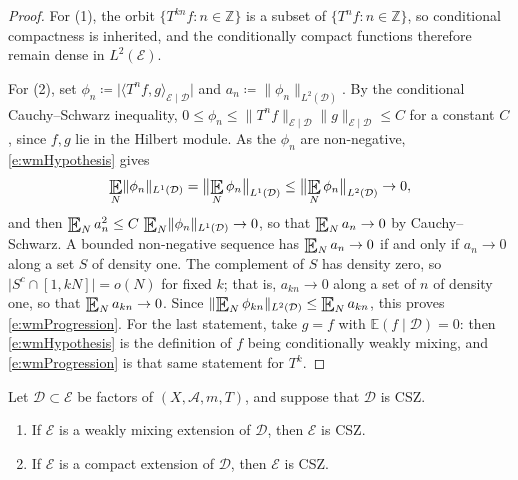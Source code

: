 \begin{proof}
For (1), the orbit $\{T ^{kn}f \colon n \in \mathbb Z\}$ is a subset of $\{T^nf \colon n \in \mathbb Z\}$, so conditional compactness is inherited, 
and the conditionally compact functions therefore remain dense in $L^2(\mathcal E)$. 

For (2), set $\phi_n \coloneqq \lvert \langle T^nf,g\rangle _{\mathcal E\mid \mathcal D}\rvert$ and $a_n \coloneqq \lVert \phi _n\rVert _{L^2(\mathcal D)}$.  
By the conditional Cauchy--Schwarz inequality, 
$0 \leq \phi _n \leq \lVert T ^{n} f\rVert _{\mathcal E\mid \mathcal D} \lVert g\rVert _{\mathcal E\mid \mathcal D} \leq C$ for a constant $C$, 
since $f, g$ lie in the Hilbert module.  
As the $\phi_n$ are non-negative, \eqref{e:wmHypothesis} gives 
\begin{equation}
\Expectation_N \lVert \phi _n \rVert_{L^1(\mathcal D)} = \bigl\lVert \Expectation_N \phi _n \bigr\rVert _{L^1(\mathcal D)} 
\leq \bigl\lVert \Expectation_N \phi _n \bigr\rVert _{L^2(\mathcal D)} \to 0 , 
\end{equation}
and then $\Expectation_N a_n ^2 \leq C \,\Expectation_N \lVert \phi_n\rVert _{L^1(\mathcal D)} \to 0$, 
so that $\Expectation_N a_n \to 0$ by Cauchy--Schwarz.  
A bounded non-negative sequence has $\Expectation_N a_n \to 0$ if and only if $a_n \to 0$ along a set $S$ of density one.  
The complement of $S$ has density zero, so $\lvert S ^{c} \cap [1, kN]\rvert = o(N)$ for fixed $k$; 
that is, $a _{kn} \to 0$ along a set of $n$ of density one, so that $\Expectation_N a _{kn} \to 0$.  
Since $\lVert \Expectation_N \phi_{kn}\rVert _{L^2(\mathcal D)} \leq \Expectation_N a _{kn}$, this proves \eqref{e:wmProgression}.  
For the last statement, take $g=f$ with $\mathbb E (f\mid \mathcal D)=0$: then \eqref{e:wmHypothesis} is the definition of 
$f$ being conditionally weakly mixing, and \eqref{e:wmProgression} is that same statement for $T^k$. 
\end{proof}

\begin{lemma} \label{l:Extensions}
Let $\mathcal D \subset \mathcal E$ be factors of $(X,\mathcal A,m,T)$, and suppose that $\mathcal D$ is CSZ.  
\begin{enumerate}
\item[(W)] If $\mathcal E$ is a weakly mixing extension of $\mathcal D$, then $\mathcal E$ is CSZ. 
\item[(K)] If $\mathcal E$ is a compact extension of $\mathcal D$, then $\mathcal E$ is CSZ. 
\end{enumerate}
\end{lemma}

